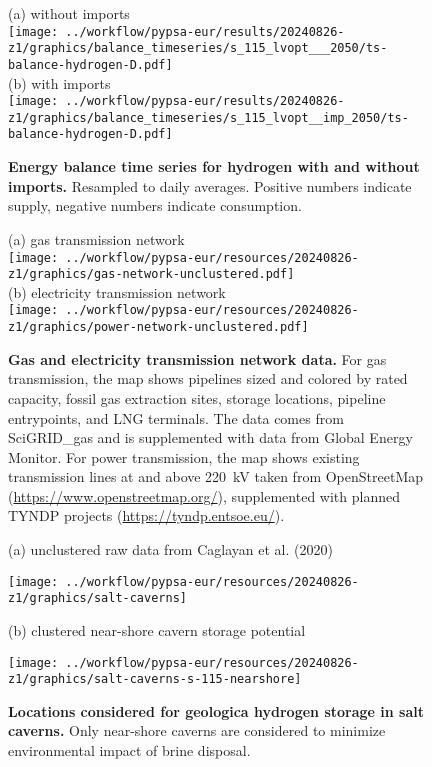 \begin{figure*}
    \centering
    \footnotesize
    (a) without imports \\
    \texttt{[image: ../workflow/pypsa-eur/results/20240826-z1/graphics/balance\_timeseries/s\_115\_lvopt\_\_\_2050/ts-balance-hydrogen-D.pdf]} \\
    (b) with imports \\
    \texttt{[image: ../workflow/pypsa-eur/results/20240826-z1/graphics/balance\_timeseries/s\_115\_lvopt\_\_imp\_2050/ts-balance-hydrogen-D.pdf]}
    \caption{\textbf{Energy balance time series for hydrogen with and without imports.} Resampled to daily averages. Positive numbers indicate supply, negative numbers indicate consumption.}
    \label{fig:si:balance-h2}
\end{figure*}

\begin{figure*}
    \centering
    \footnotesize
    (a) gas transmission network \\
    \texttt{[image: ../workflow/pypsa-eur/resources/20240826-z1/graphics/gas-network-unclustered.pdf]} \\
    (b) electricity transmission network \\
    \texttt{[image: ../workflow/pypsa-eur/resources/20240826-z1/graphics/power-network-unclustered.pdf]}
    \caption{\textbf{Gas and electricity transmission network data.} For gas
    transmission, the map shows pipelines sized and colored by rated capacity,
    fossil gas extraction sites, storage locations, pipeline entrypoints, and
    LNG terminals. The data comes from SciGRID\_gas and is supplemented with
    data from Global Energy Monitor. For power transmission, the map shows
    existing transmission lines at and above 220~kV taken from OpenStreetMap (\url{https://www.openstreetmap.org/}),
    supplemented with planned TYNDP projects (\url{https://tyndp.entsoe.eu/}).}
    \label{fig:si:networks-raw}
\end{figure*}

\begin{figure*}
    \footnotesize
    (a) unclustered raw data from Caglayan et al. (2020) \\
    \begin{center}
        \texttt{[image: ../workflow/pypsa-eur/resources/20240826-z1/graphics/salt-caverns]}\\
    \end{center}
    (b) clustered near-shore cavern storage potential \\
    \begin{center}
        \texttt{[image: ../workflow/pypsa-eur/resources/20240826-z1/graphics/salt-caverns-s-115-nearshore]}
    \end{center}
    \caption{\textbf{Locations considered for geologica hydrogen storage in salt
    caverns.} Only near-shore caverns are considered to minimize environmental
    impact of brine disposal.}
    \label{fig:si:hydrogen-caverns}
\end{figure*}


